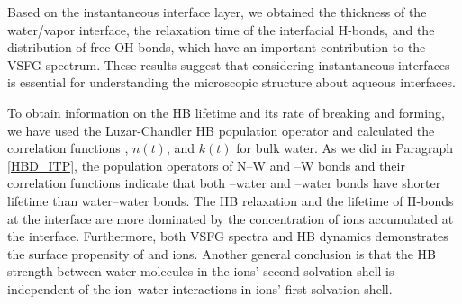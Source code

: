 Based on the instantaneous interface layer, we obtained 
the thickness of the water/vapor interface, the relaxation time of the interfacial H-bonds, 
and the distribution of free OH bonds, which have an important contribution to the VSFG spectrum.
These results suggest that considering instantaneous interfaces is essential for understanding the microscopic structure about aqueous interfaces.

To obtain information on the HB lifetime and its rate of breaking and forming, we have used the Luzar-Chandler HB population operator and calculated the correlation functions \CHB, $n(t)$, and $k(t)$ for bulk water. 
As we did in Paragraph \ref{HBD_ITP}, the population operators of N--W 
and \I--W bonds and their correlation functions 
indicate that both \nitrate--water and \I--water bonds have shorter lifetime than water--water bonds.
The HB relaxation and the lifetime of H-bonds
at the interface are more dominated by the concentration of ions accumulated at the interface. 
Furthermore, both VSFG spectra and HB dynamics demonstrates the surface propensity of \nitrate and \I ions.
Another general conclusion is that the HB strength between water molecules in the ions' second solvation shell is independent 
of the ion--water interactions in ions' first solvation shell.

